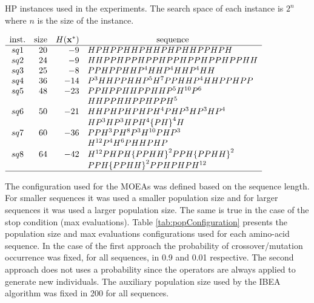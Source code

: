 \begin{table}[]
	\begin{center}
		\caption{HP instances used in the experiments. The search space of each instance is $2^n$ where $n$ is the size of
			the instance.}
		\label{tab:instances}
		{$\begin{array}{c r r l}
			\text{inst.} & \text{size} &  \multicolumn{1}{ c }{H({\bf{x}}^*)} & \multicolumn{1}{c}{\text{sequence}} \\ \hline
			sq1 &20 &-9 & HPHPPHHPHHPHPHHPPHPH \\
			sq2 &24 &-9 & HHPPHPPHPPHPPHPPHPPHPPHH \\
			sq3 &25 &-8 & PPHPPHHP^4HHP^4HHP^4HH \\
			sq4 &36 &-14 &  P^3HHPPHHP^5H^7PPHHP^4HHPPHPP\\
			sq5 &48 &-23 &  PPHPPHHPPHHP^5H^{10}P^6 \\
			&   &    &  HHPPHHPPHPPH^5 \\
			sq6 &50 &-21 &  HHPHPHPHPH^4PHP^3HP^3HP^4 \\
			&   &    & HP^3HP^3HPH^4{\{PH\}}^4H\\
			sq7 &60 &-36 &  PPH^3PH^8P^3H^{10}PHP^3\\
			&   &    &  H^{12}P^4H^6PHHPHP\\
			sq8 &64 &-42 &   H^{12}PHPH{\{PPHH\}}^2PPH{\{PPHH\}}^2\\
			&   &    &  PPH{\{PPHH\}}^2PPHPHPH^{12}\\
			\hline
			\end{array}$}
	\end{center}
\end{table}

The configuration used for the MOEAs was defined based on the sequence length. For smaller sequences it was used a smaller population size and for larger sequences it was used a larger population size. The same is true in the case of the stop condition (max evaluations). Table \ref{tab:popConfiguration} presents the population size and max evaluations configurations used for each amino-acid sequence. In the case of the first approach the probability of crossover/mutation occurrence was fixed, for all sequences, in 0.9 and 0.01 respective. The second approach does not uses a probability since the operators are always applied to generate new individuals. The auxiliary population size used by the IBEA algorithm was fixed in 200 for all sequences.   
%

